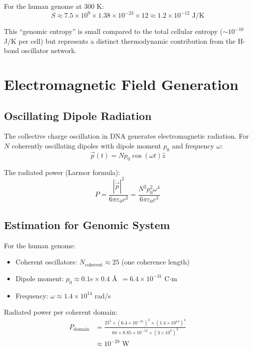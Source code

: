 \documentclass[twocolumn,10pt]{article}
\theoremstyle{remark}
\begin{document}
For the human genome at 300 K:
\begin{equation}
S \approx 7.5 \times 10^9 \times 1.38 \times 10^{-23} \times 12 \approx 1.2 \times 10^{-12} \text{ J/K}
\end{equation}

This ``genomic entropy'' is small compared to the total cellular entropy ($\sim$$10^{-10}$ J/K per cell) but represents a distinct thermodynamic contribution from the H-bond oscillator network.

\section{Electromagnetic Field Generation}

\subsection{Oscillating Dipole Radiation}

The collective charge oscillation in DNA generates electromagnetic radiation. For $N$ coherently oscillating dipoles with dipole moment $p_0$ and frequency $\omega$:
\begin{equation}
\vec{p}(t) = N p_0 \cos(\omega t) \hat{z}
\end{equation}

The radiated power (Larmor formula):
\begin{equation}
P = \frac{|\ddot{\vec{p}}|^2}{6\pi\varepsilon_0 c^3} = \frac{N^2 p_0^2 \omega^4}{6\pi\varepsilon_0 c^3}
\end{equation}

\subsection{Estimation for Genomic System}

For the human genome:
\begin{itemize}
\item Coherent oscillators: $N_{\mathrm{coherent}} \approx 25$ (one coherence length)
\item Dipole moment: $p_0 \approx 0.1e \times 0.4$ \AA\ $= 6.4 \times 10^{-31}$ C$\cdot$m
\item Frequency: $\omega \approx 1.4 \times 10^{14}$ rad/s
\end{itemize}

Radiated power per coherent domain:
\begin{align}
P_{\mathrm{domain}} &= \frac{25^2 \times (6.4 \times 10^{-31})^2 \times (1.4 \times 10^{14})^4}{6\pi \times 8.85 \times 10^{-12} \times (3 \times 10^8)^3} \\
&\approx 10^{-28} \text{ W}
\end{align}
\end{document}

